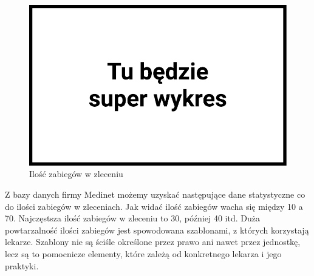 \pagebreak
\begin{figure}[h]
	\centering
	\includegraphics[width=\textwidth]{gfx/medinet-treatments-stats.pdf}
	\caption{Ilość zabiegów w zleceniu}
	\label{medinet-treatments-stats}
\end{figure}
Z bazy danych firmy Medinet możemy uzyskać następujące dane statystyczne co do
ilości zabiegów w zleceniach. Jak widać ilość zabiegów wacha się między 10 a 70.
Najczęstsza ilość zabiegów w zleceniu to 30, później 40 itd. Duża powtarzalność
ilości zabiegów jest spowodowana szablonami, z których korzystają lekarze.
Szablony nie są ściśle określone przez prawo ani nawet przez jednostkę, lecz są
to pomocnicze elementy, które zależą od konkretnego lekarza i jego praktyki.
\pagebreak
